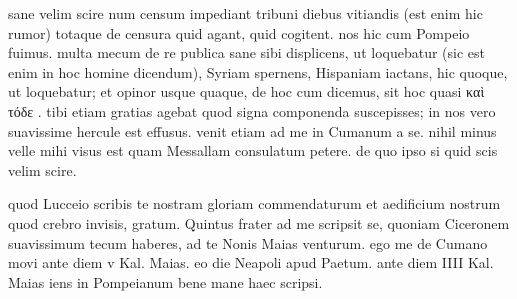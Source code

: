 


 sane velim scire num censum impediant tribuni diebus vitiandis (est enim hic rumor) totaque de censura quid agant, quid cogitent. nos hic cum Pompeio fuimus. multa mecum de re publica sane sibi displicens, ut loquebatur (sic est enim in hoc homine dicendum), Syriam spernens, Hispaniam iactans, hic quoque, ut loquebatur; et opinor usque quaque, de hoc cum dicemus, sit hoc quasi καὶ τόδε . tibi etiam gratias agebat quod signa componenda suscepisses; in nos vero suavissime hercule est effusus. venit etiam ad me in Cumanum a se. nihil minus velle mihi visus est quam Messallam consulatum petere. de quo ipso si quid scis velim scire.

 quod Lucceio scribis te nostram gloriam commendaturum et aedificium nostrum quod crebro invisis, gratum. Quintus frater ad me scripsit se, quoniam Ciceronem suavissimum tecum haberes, ad te Nonis Maias venturum. ego me de Cumano movi ante diem v Kal. Maias. eo die Neapoli apud Paetum. ante diem IIII Kal. Maias iens in Pompeianum bene mane haec scripsi.
